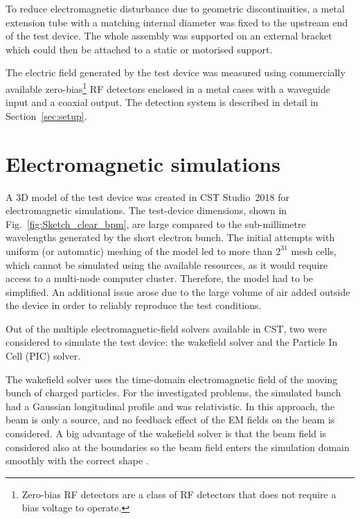 To reduce electromagnetic disturbance due to geometric discontinuities, a metal extension tube with a matching internal diameter was fixed to the upstream end of the test device. The whole assembly was supported on an external bracket which could then be attached to a static or motorised support.

The electric field generated by the test device was measured using commercially available zero-bias\footnote{Zero-bias RF detectors are a class of RF detectors that does not require a bias voltage to operate.} RF detectors enclosed in a metal cases with a waveguide input and a coaxial output. The detection system is described in detail in Section~\ref{sec:setup}.








\section[Electromagnetic simulations]{Electromagnetic simulations}\label{sec:simulations}

A 3D model of the test device was created in CST Studio~2018 \cite{CST} for electromagnetic simulations. The test-device dimensions, shown in Fig.~\ref{fig:Sketch_clear_bpm}, are large compared to the sub-millimetre wavelengths generated by the short electron bunch. The initial attempts with uniform (or automatic) meshing of the model led to more than $2^{31}$ mesh cells, which cannot be simulated using the available resources, as it would require access to a multi-node computer cluster. Therefore, the model had to be simplified. An additional issue arose due to the large volume of air added outside the device in order to reliably reproduce the test conditions. 

Out of the multiple electromagnetic-field solvers available in CST, two were considered to simulate the test device: the wakefield solver and the Particle In Cell (PIC) solver. 

The wakefield solver uses the time-domain electromagnetic field of the moving bunch of charged particles. For the investigated problems, the simulated bunch had a Gaussian longitudinal profile and was relativistic. In this approach, the beam is only a source, and no feedback effect of the EM fields on the beam is considered. A big advantage of the wakefield solver is that the beam field is considered also at the boundaries so the beam field enters the simulation domain smoothly with the correct shape \cite{CST:pc}. 

